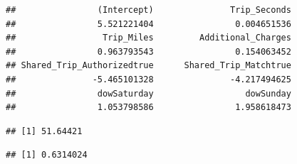 \documentclass[
]{article}
\newenvironment{Shaded}{\begin{snugshade}}{\end{snugshade}}
\newcommand{\DecValTok}[1]{\textcolor[rgb]{0.00,0.00,0.81}{#1}}
\newcommand{\FunctionTok}[1]{\textcolor[rgb]{0.13,0.29,0.53}{\textbf{#1}}}
\newcommand{\NormalTok}[1]{#1}
\newcommand{\OtherTok}[1]{\textcolor[rgb]{0.56,0.35,0.01}{#1}}
\newcommand{\SpecialCharTok}[1]{\textcolor[rgb]{0.81,0.36,0.00}{\textbf{#1}}}
\begin{document}
\begin{verbatim}
##                (Intercept)               Trip_Seconds 
##                5.521221404                0.004651536 
##                 Trip_Miles         Additional_Charges 
##                0.963793543                0.154063452 
## Shared_Trip_Authorizedtrue      Shared_Trip_Matchtrue 
##               -5.465101328               -4.217494625 
##                dowSaturday                  dowSunday 
##                1.053798586                1.958618473
\end{verbatim}

\begin{Shaded}
\end{Shaded}

\begin{verbatim}
## [1] 51.64421
\end{verbatim}

\begin{Shaded}
\end{Shaded}

\begin{verbatim}
## [1] 0.6314024
\end{verbatim}
\end{document}
